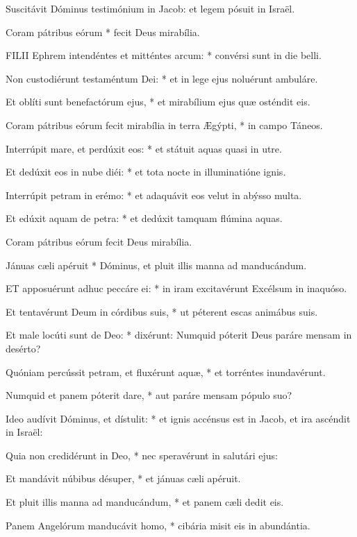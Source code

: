  Suscitávit Dóminus testimónium in Jacob: et legem pósuit in Israël.

 Coram pátribus eórum * fecit Deus mirabília.


\lettrine[lines=2]{F}{ILII} Ephrem intendéntes et mitténtes arcum: * convérsi sunt in die belli.

Non custodiérunt testaméntum Dei: * et in lege ejus noluérunt ambuláre.

Et oblíti sunt benefactórum ejus, * et mirabílium ejus quæ osténdit eis.

Coram pátribus eórum fecit mirabília in terra Ægýpti, * in campo Táneos.

Interrúpit mare, et perdúxit eos: * et státuit aquas quasi in utre.

Et dedúxit eos in nube diéi: * et tota nocte in illuminatióne ignis.

Interrúpit petram in erémo: * et adaquávit eos velut in abýsso multa.

Et edúxit aquam de petra: * et dedúxit tamquam flúmina aquas.

 Coram pátribus eórum fecit Deus mirabília.

 Jánuas cæli apéruit * Dóminus, et pluit illis manna ad manducándum.


\lettrine[lines=2]{E}{T} apposuérunt adhuc peccáre ei: * in iram excitavérunt Excélsum in inaquóso.

Et tentavérunt Deum in córdibus suis, * ut péterent escas animábus suis.

Et male locúti sunt de Deo: * dixérunt: Numquid póterit Deus paráre mensam in desérto?

Quóniam percússit petram, et fluxérunt aquæ, * et torréntes inundavérunt.

Numquid et panem póterit dare, * aut paráre mensam pópulo suo?

Ideo audívit Dóminus, et dístulit: * et ignis accénsus est in Jacob, et ira ascéndit in Israël:

Quia non credidérunt in Deo, * nec speravérunt in salutári ejus:

Et mandávit núbibus désuper, * et jánuas cæli apéruit.

Et pluit illis manna ad manducándum, * et panem cæli dedit eis.

Panem Angelórum manducávit homo, * cibária misit eis in abundántia.


